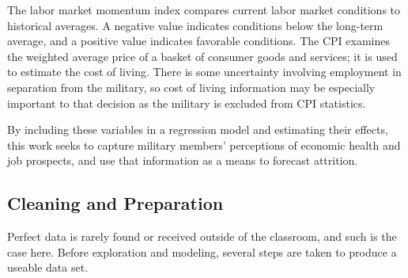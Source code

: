 \documentclass[12pt,letterpaper,toc=flat,oneside]{report}
\theoremstyle{definition}
\theoremstyle{definition}
\theoremstyle{definition}
\theoremstyle{remark}
\begin{document}
The labor market momentum index compares current labor market conditions
to historical averages. A negative value indicates conditions below the
long-term average, and a positive value indicates favorable conditions.
The CPI examines the weighted average price of a basket of consumer
goods and services; it is used to estimate the cost of living. There is
some uncertainty involving employment in separation from the military,
so cost of living information may be especially important to that
decision as the military is excluded from CPI statistics.

By including these variables in a regression model and estimating their
effects, this work seeks to capture military members' perceptions of
economic health and job prospects, and use that information as a means
to forecast attrition.

\begin{table}

\caption{\label{tab:econ-var}Selected Economic Indicators}
\centering
{}
\end{table}

\hypertarget{cleaning-and-preparation}{%
\subsection{Cleaning and Preparation}\label{cleaning-and-preparation}}

Perfect data is rarely found or received outside of the classroom, and
such is the case here. Before exploration and modeling, several steps
are taken to produce a useable data set.
\end{document}
